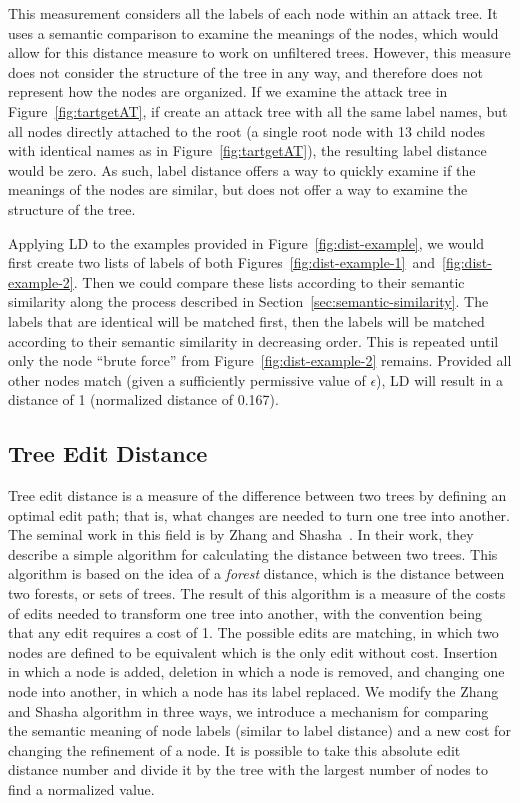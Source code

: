 This measurement considers all the labels of each node within an attack tree. It uses a semantic comparison to examine the meanings of the nodes, which would allow for this distance measure to work on unfiltered trees. However, this measure does not consider the structure of the tree in any way, and therefore does not represent how the nodes are organized. If we examine the attack tree in Figure~\ref{fig:tartgetAT}, if create an attack tree with all the same label names, but all nodes directly attached to the root (a single root node with 13 child nodes with identical names as in Figure~\ref{fig:tartgetAT}), the resulting label distance would be zero. As such, label distance offers a way to quickly examine if the meanings of the nodes are similar, but does not offer a way to examine the structure of the tree. 


Applying LD to the examples provided in Figure~\ref{fig:dist-example}, we would first create two lists of labels of both Figures~\ref{fig:dist-example-1}~and~\ref{fig:dist-example-2}. Then we could compare these lists according to their semantic similarity along the process described in Section~\ref{sec:semantic-similarity}. The labels that are identical will be matched first, then the labels will be matched according to their semantic similarity in decreasing order. This is repeated until only the node ``brute force'' from Figure~\ref{fig:dist-example-2} remains. Provided all other nodes match (given a sufficiently permissive value of $\epsilon$), LD will result in a distance of 1 (normalized distance of 0.167).



\subsection{Tree Edit Distance}
\label{ssec:ted}

Tree edit distance is a measure of the difference between two trees by defining an optimal edit path; that is, what changes are needed to turn one tree into another. The seminal work in this field is by Zhang and Shasha~\cite{Zhang_Shasha_1989}. In their work, they describe a simple algorithm for calculating the distance between two trees. This algorithm is based on the idea of a \textit{forest} distance, which is the distance between two forests, or sets of trees. The result of this algorithm is a measure of the costs of edits needed to transform one tree into another, with the convention being that any edit requires a cost of 1. The possible edits are matching, in which two nodes are defined to be equivalent which is the only edit without cost. Insertion in which a node is added, deletion in which a node is removed, and changing one node into another, in which a node has its label replaced. We modify the Zhang and Shasha algorithm in three ways, we introduce a mechanism for comparing the semantic meaning of node labels (similar to label distance) and  a new cost for changing the refinement of a node. It is possible to take this absolute edit distance number and divide it by the tree with the largest number of nodes to find a normalized value.

